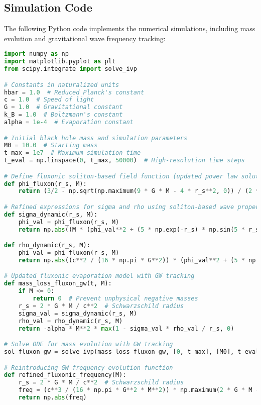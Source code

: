 \documentclass{article}
\begin{document}
\subsection{Simulation Code}
The following Python code implements the numerical simulations, including mass evolution and gravitational wave frequency tracking:
\begin{lstlisting}[language=Python, caption=Fluxonic Black Hole Evaporation Simulation with GW Frequency Tracking, label=lst:fluxonic_simulation]
import numpy as np
import matplotlib.pyplot as plt
from scipy.integrate import solve_ivp

# Constants in naturalized units
hbar = 1.0  # Reduced Planck's constant
c = 1.0  # Speed of light
G = 1.0  # Gravitational constant
k_B = 1.0  # Boltzmann's constant
alpha = 1e-4  # Evaporation constant

# Initial black hole mass and simulation parameters
M0 = 10.0  # Starting mass
t_max = 1e7  # Maximum simulation time
t_eval = np.linspace(0, t_max, 50000)  # High-resolution time steps

# Define fluxonic soliton-based field function (updated power law solution)
def phi_fluxon(r_s, M):
    return (3/2 - np.sqrt(np.maximum(9 * G * M - 4 * r_s**2, 0)) / (2 * np.sqrt(G) * np.sqrt(M))) * r_s

# Refined expressions for sigma and rho using soliton-based wave properties
def sigma_dynamic(r_s, M):
    phi_val = phi_fluxon(r_s, M)
    return np.abs((M * (phi_val**2 + (5 * np.exp(-r_s) * np.sin(5 * r_s))**2) - (c**3 * hbar) / (8 * np.pi * G)) / (8 * np.pi * G * M))

def rho_dynamic(r_s, M):
    phi_val = phi_fluxon(r_s, M)
    return np.abs((c**2 / (16 * np.pi * G**2)) * (phi_val**2 + (5 * np.exp(-r_s) * np.sin(5 * r_s))**2))

# Updated fluxonic evaporation model with GW tracking
def mass_loss_fluxon_gw(t, M):
    if M <= 0:
        return 0  # Prevent unphysical negative masses
    r_s = 2 * G * M / c**2  # Schwarzschild radius
    sigma_val = sigma_dynamic(r_s, M)
    rho_val = rho_dynamic(r_s, M)
    return -alpha * M**2 * max(1 - sigma_val * rho_val / r_s, 0)

# Solve ODE for mass evolution with GW tracking
sol_fluxon_gw = solve_ivp(mass_loss_fluxon_gw, [0, t_max], [M0], t_eval=t_eval, method='RK45')

# Reintroducing GW frequency evolution function
def refined_fluxonic_frequency(M):
    r_s = 2 * G * M / c**2  # Schwarzschild radius
    freq = (c**3 / (16 * np.pi * G**2 * M**2)) * np.maximum(2 * G * M - c**2 * rho_dynamic(r_s, M), 0)  # Ensure non-negative frequencies
    return np.abs(freq)


\end{lstlisting}
\end{document}
